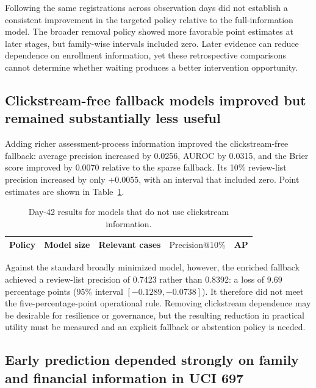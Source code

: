 \documentclass[education,article,submit,moreauthors]{Definitions/mdpi}
\makeatletter
\newcommand{\Pten}{\ensuremath{\mathrm{Precision}@10\%}}
\makeatother
\begin{document}
Following the same registrations across observation days did not establish a consistent improvement in the targeted policy relative to the full-information model. The broader removal policy showed more favorable point estimates at later stages, but family-wise intervals included zero. Later evidence can reduce dependence on enrollment information, yet these retrospective comparisons cannot determine whether waiting produces a better intervention opportunity.

\subsection{Clickstream-free fallback models improved but remained substantially less useful}

Adding richer assessment-process information improved the clickstream-free fallback: average precision increased by 0.0256, AUROC by 0.0315, and the Brier score improved by 0.0070 relative to the sparse fallback. Its 10\% review-list precision increased by only $+0.0055$, with an interval that included zero. Point estimates are shown in Table~\ref{tab:strict}.

\begin{table}[H]
\centering
\caption{Day-42 results for models that do not use clickstream information.}
\label{tab:strict}
\footnotesize
\setlength{\tabcolsep}{4pt}
\begin{tabular}{lrrrr}
\toprule
Policy & Model size & Relevant cases & \Pten & AP \\
\midrule

\end{tabular}
\end{table}

Against the standard broadly minimized model, however, the enriched fallback achieved a review-list precision of 0.7423 rather than 0.8392: a loss of 9.69 percentage points (95\% interval $[-0.1289,-0.0738]$). It therefore did not meet the five-percentage-point operational rule. Removing clickstream dependence may be desirable for resilience or governance, but the resulting reduction in practical utility must be measured and an explicit fallback or abstention policy is needed.

\subsection{Early prediction depended strongly on family and financial information in UCI 697}
\end{document}
